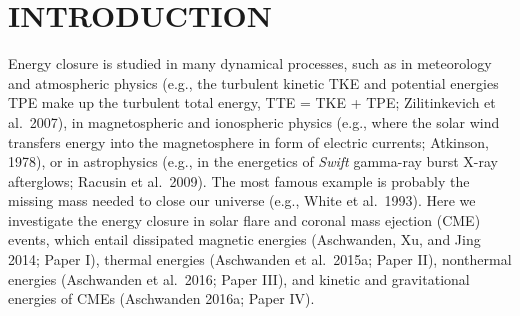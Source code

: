 \documentclass[10pt,preprint]{aastex}  %
\begin{document}
\section{	INTRODUCTION			}

Energy closure is studied in many dynamical processes, such as in
meteorology and atmospheric physics (e.g., the turbulent kinetic TKE 
and potential energies TPE make up the turbulent total energy, 
TTE = TKE + TPE; Zilitinkevich et al.~2007), in magnetospheric and
ionospheric physics (e.g., where the solar wind transfers energy
into the magnetosphere in form of electric currents;
Atkinson, 1978), or in astrophysics (e.g., in the
energetics of {\sl Swift} gamma-ray burst X-ray afterglows;
Racusin et al.~2009). The most famous example is probably the
missing mass needed to close our universe (e.g., White et al.~1993).
Here we investigate the energy closure
in solar flare and coronal mass ejection (CME) events, which
entail dissipated magnetic energies (Aschwanden, Xu, and Jing 2014; 
Paper I), thermal energies (Aschwanden et al.~2015a; Paper II), 
nonthermal energies (Aschwanden et al.~2016; Paper III), and
kinetic and gravitational energies of CMEs (Aschwanden 2016a; Paper IV). 
\end{document}
